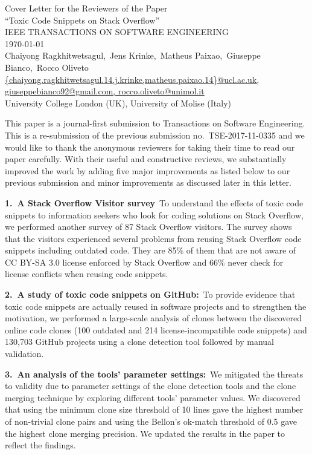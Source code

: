 \documentclass[a4paper,twoside,10pt]{reviewresponse}
\makeatletter
\newcommand{\myAuthors}{Chaiyong Ragkhitwetsagul,~Jens Krinke,~Matheus Paixao,~Giuseppe Bianco,~Rocco Oliveto}
\newcommand{\myEmail}{{chaiyong.ragkhitwetsagul.14,j.krinke,matheus.paixao.14}@ucl.ac.uk, giuseppebianco92@gmail.com, rocco.oliveto@unimol.it}
\newcommand{\myTitle}{Cover Letter for the Reviewers of the Paper \\ ``Toxic Code Snippets on Stack Overflow''}
\newcommand{\myJournal}{IEEE TRANSACTIONS ON SOFTWARE ENGINEERING}
\newcommand{\myDept}{University College London (UK), University of Molise (Italy)}
\makeatother
\begin{document}
\thispagestyle{plain}

\begin{center}
 {\LARGE\myTitle} \vspace{0.3cm} \\
 {\large\myJournal} \vspace{0.3cm} \\
 \today \vspace{0.3cm} \\
 \myAuthors \\
 \url{\myEmail} \\
 \vspace{0.3cm} 
 \myDept \vspace{1cm}
\end{center}


This paper is a journal-first submission to Transactions on Software
Engineering. This is a re-submission of the previous submission
no.~TSE-2017-11-0335 and we would like to thank the anonymous reviewers for
taking their time to read our paper carefully. With their useful and
constructive reviews, we substantially improved the work by adding five major
improvements as listed below to our previous submission and minor improvements
as discussed later in this letter.

\textbf{1.~A Stack Overflow Visitor survey}~To understand the effects of toxic
code snippets to information seekers who look for coding
solutions on Stack Overflow, we performed another survey of 87 Stack Overflow
visitors. The survey shows that the visitors experienced several problems from
reusing Stack Overflow code snippets including outdated code. They are 85\% of
them that are not aware of CC BY-SA 3.0 license enforced by Stack Overflow and
66\% never check for license conflicts when reusing code snippets.

\textbf{2.~A study of toxic code snippets on GitHub:}~To provide evidence that
toxic code snippets are actually reused in software projects and to strengthen
the motivation, we performed a large-scale analysis of clones between the
discovered online code clones (100 outdated and 214 license-incompatible code
snippets) and 130,703 GitHub projects using a clone detection tool followed by
manual validation.

\textbf{3.~An analysis of the tools' parameter settings:}~We mitigated the
threats to validity due to parameter settings of the clone detection tools and
the clone merging technique by exploring different tools' parameter values. We
discovered that using the minimum clone size threshold of 10 lines gave the
highest number of non-trivial clone pairs and using the Bellon's ok-match
threshold of 0.5 gave the highest clone merging precision. We updated the
results in the paper to reflect the findings.
\end{document}
